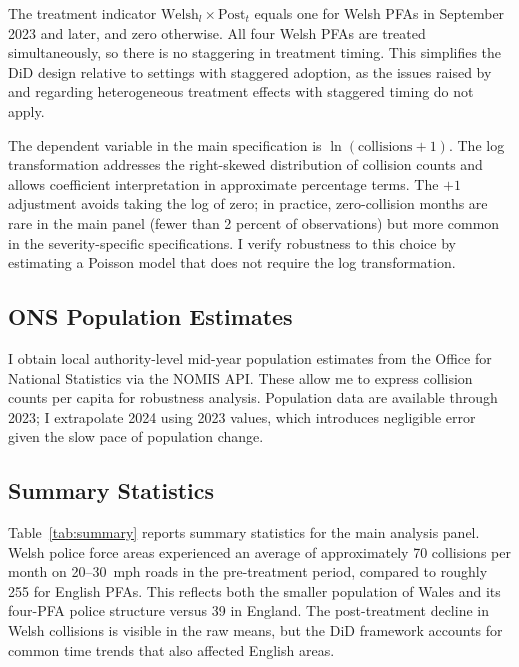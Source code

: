 \documentclass[12pt]{article}
\begin{document}
The treatment indicator $\text{Welsh}_l \times \text{Post}_t$ equals one for Welsh PFAs in September 2023 and later, and zero otherwise. All four Welsh PFAs are treated simultaneously, so there is no staggering in treatment timing. This simplifies the DiD design relative to settings with staggered adoption, as the issues raised by \citet{goodmanbacon2021} and \citet{callawaySantanna2021} regarding heterogeneous treatment effects with staggered timing do not apply.

The dependent variable in the main specification is $\ln(\text{collisions} + 1)$. The log transformation addresses the right-skewed distribution of collision counts and allows coefficient interpretation in approximate percentage terms. The $+1$ adjustment avoids taking the log of zero; in practice, zero-collision months are rare in the main panel (fewer than 2 percent of observations) but more common in the severity-specific specifications. I verify robustness to this choice by estimating a Poisson model that does not require the log transformation.

\subsection{ONS Population Estimates}

I obtain local authority-level mid-year population estimates from the Office for National Statistics via the NOMIS API. These allow me to express collision counts per capita for robustness analysis. Population data are available through 2023; I extrapolate 2024 using 2023 values, which introduces negligible error given the slow pace of population change.

\subsection{Summary Statistics}



Table~\ref{tab:summary} reports summary statistics for the main analysis panel. Welsh police force areas experienced an average of approximately 70 collisions per month on 20--30~mph roads in the pre-treatment period, compared to roughly 255 for English PFAs. This reflects both the smaller population of Wales and its four-PFA police structure versus 39 in England. The post-treatment decline in Welsh collisions is visible in the raw means, but the DiD framework accounts for common time trends that also affected English areas.
\end{document}
